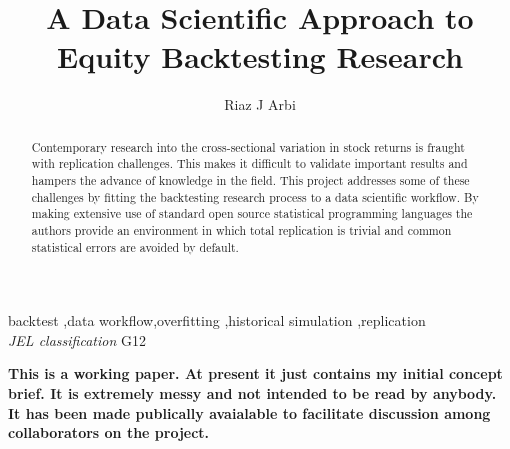 \documentclass[11pt,preprint, authoryear]{elsarticle}
\numberwithin{equation}{section}
\numberwithin{figure}{section}
\numberwithin{table}{section}
\begin{document}
\begin{frontmatter}  %

\title{A Data Scientific Approach to Equity Backtesting Research}

\author[Add1]{Riaz J Arbi}





\address[Add1]{University of Cape Town, Cape Town, South Africa}


\begin{abstract}
\small{
Contemporary research into the cross-sectional variation in stock
returns is fraught with replication challenges. This makes it difficult
to validate important results and hampers the advance of knowledge in
the field. This project addresses some of these challenges by fitting
the backtesting research process to a data scientific workflow. By
making extensive use of standard open source statistical programming
languages the authors provide an environment in which total replication
is trivial and common statistical errors are avoided by default.
}
\end{abstract}

\vspace{1cm}

\begin{keyword}
\footnotesize{
backtest \sep data workflow\sep overfitting \sep historical simulation
\sep replication \\ \vspace{0.3cm}
\textit{JEL classification} G12
}
\end{keyword}
\vspace{0.5cm}
\end{frontmatter}



\pagestyle{fancy}
\chead{}
\rhead{}
\lfoot{}
\lhead{}
\cfoot{}


\headsep 35pt %




\textbf{This is a working paper. At present it just contains my initial
concept brief. It is extremely messy and not intended to be read by
anybody. It has been made publically avaialable to facilitate discussion
among collaborators on the project.}
\end{document}

